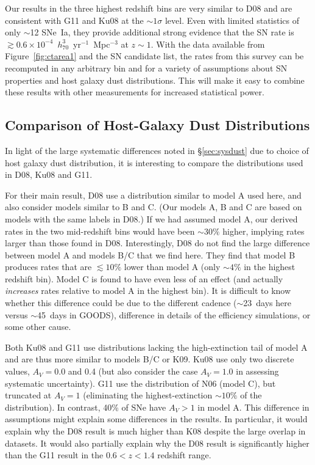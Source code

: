 Our results in the three highest redshift bins are very similar to D08
and are consistent with G11 and Ku08 at the $\sim$$1\sigma$
level. Even with limited statistics of only $\sim$12 SNe~Ia, they
provide additional strong evidence that the SN rate is $\gtrsim 0.6
\times 10^{-4}$~$h_{70}^{3}$~yr$^{-1}$~Mpc$^{-3}$ at $z \sim 1$. With
the data available from Figure~\ref{fig:ctarea1} and the SN candidate
list, the rates from this survey can be recomputed in any arbitrary
bin and for a variety of assumptions about SN properties and host
galaxy dust distributions. This will make it easy to combine these
results with other measurements for increased statistical power.

\subsection{Comparison of Host-Galaxy Dust Distributions}

In light of the large systematic differences noted
in \S\ref{sec:sysdust} due to choice of host galaxy dust distribution,
it is interesting to compare the distributions used in D08, Ku08 and
G11.  

For their main result, D08 use a distribution similar to model A used
here, and also consider models similar to B and C. (Our models A, B
and C are based on models with the same labels in D08.) If we had
assumed model A, our derived rates in the two mid-redshift bins
would have been $\sim$$30\%$ higher, implying rates larger than
those found in D08. Interestingly, D08 do not find the large
difference between model A and models B/C that we find here. They find
that model B produces rates that are $\lesssim 10\%$ lower than model
A (only $\sim$$4\%$ in the highest redshift bin). Model C is found to
have even less of an effect (and actually \emph{increases} rates
relative to model A in the highest bin). It is difficult to know
whether this difference could be due to the different cadence
($\sim$23~days here versus $\sim$45~days in GOODS), difference in
details of the efficiency simulations, or some other cause.

Both Ku08 and G11 use distributions lacking the high-extinction tail
of model A and are thus more similar to models B/C or K09. Ku08 use
only two discrete values, $A_V = 0.0$ and 0.4 (but also consider the
case $A_V = 1.0$ in assessing systematic uncertainty). G11 use the
distribution of N06 (model C), but truncated at $A_V = 1$ (eliminating
the highest-extinction $\sim$$10\%$ of the distribution). In contrast,
40\% of SNe have $A_V > 1$ in model A. This difference in assumptions
might explain some differences in the results. In particular, it would
explain why the D08 result is much higher than K08 despite the large
overlap in datasets. It would also partially explain why the D08
result is significantly higher than the G11 result in the $0.6 < z <
1.4$ redshift range. 
